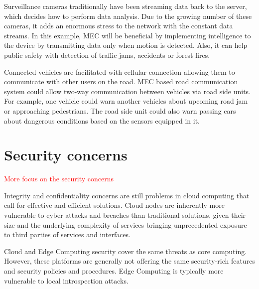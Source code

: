 Surveillance cameras traditionally have been streaming data back to the server, which decides how to perform data analysis. Due to the growing number of these cameras, it adds an enormous stress to the network with the constant data streams. In this example, MEC will be beneficial by implementing intelligence to the device by transmitting data only when motion is detected. Also, it can help public safety with detection of traffic jams, accidents or forest fires.

Connected vehicles are facilitated with cellular connection allowing them to communicate with other users on the road. MEC based road communication system could allow two-way communication between vehicles via road side units. For example, one vehicle could warn another vehicles about upcoming road jam or approaching pedestrians. The road side unit could also warn passing cars about dangerous conditions based on the sensors equipped in it. \cite{Abbas2018}

\section{Security concerns}
\textcolor{red}{More focus on the security concerns}

Integrity and confidentiality concerns are still problems in cloud computing that call for effective and efficient solutions. Cloud nodes are inherently more vulnerable to cyber-attacks and breaches than traditional solutions, given their size and the underlying complexity of services bringing unprecedented exposure to third parties of services and interfaces. \cite{Lombardi2011}

Cloud and Edge Computing security cover the same threats as core computing. However, these platforms are generally not offering the same security-rich features and security policies and procedures. Edge Computing is typically more vulnerable to local introspection attacks. \cite{EdgeComputing5G}

